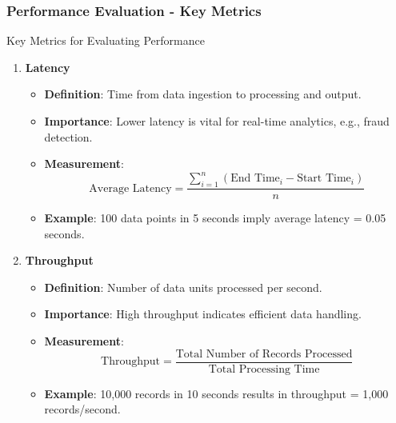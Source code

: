 \documentclass[aspectratio=169]{beamer}
\begin{document}
\begin{frame}[fragile]
    \frametitle{Performance Evaluation - Key Metrics}
    \begin{block}{Key Metrics for Evaluating Performance}
        \begin{enumerate}
            \item \textbf{Latency}
                \begin{itemize}
                    \item \textbf{Definition}: Time from data ingestion to processing and output.
                    \item \textbf{Importance}: Lower latency is vital for real-time analytics, e.g., fraud detection.
                    \item \textbf{Measurement}:
                    \[
                    \text{Average Latency} = \frac{\sum_{i=1}^{n} (\text{End Time}_i - \text{Start Time}_i)}{n}
                    \]
                    \item \textbf{Example}: 100 data points in 5 seconds imply average latency = 0.05 seconds.
                \end{itemize}
            \item \textbf{Throughput}
                \begin{itemize}
                    \item \textbf{Definition}: Number of data units processed per second.
                    \item \textbf{Importance}: High throughput indicates efficient data handling.
                    \item \textbf{Measurement}:
                    \[
                    \text{Throughput} = \frac{\text{Total Number of Records Processed}}{\text{Total Processing Time}}
                    \]
                    \item \textbf{Example}: 10,000 records in 10 seconds results in throughput = 1,000 records/second.
                \end{itemize}
        \end{enumerate}
    \end{block}
\end{frame}
\end{document}
